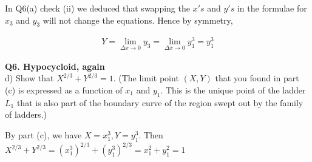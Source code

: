 \documentclass[9pt]{article}
\begin{document}
In Q6(a) check (ii) we deduced that swapping the $x's$ and $y's$ in the formulae for $x_3$ and $y_3$ will not change the equations. Hence by symmetry,

\begin{align*}
  Y = \lim_{\Delta x \rightarrow 0} y_3 = \lim_{\Delta x \rightarrow 0} y_1^3 = y_1^3
\end{align*}

\begin{tcolorbox}
  \textbf{Q6. Hypocycloid, again} \\
  d) Show that $X^{2/3} + Y^{2/3} = 1$. (The limit point $(X,Y)$ that you found in part (c) is expressed as a function of $x_1$ and $y_1$. This is the unique point of the ladder $L_1$ that is also part of the boundary curve of the region swept out by the family of ladders.)
\end{tcolorbox}

By part (c), we have $X = x_1^3, Y = y_1^3$. Then $X^{2/3} + Y^{2/3} = (x_1^3)^{2/3} + (y_1^3)^{2/3} = x_1^2 + y_1^2 = 1$
\end{document}
